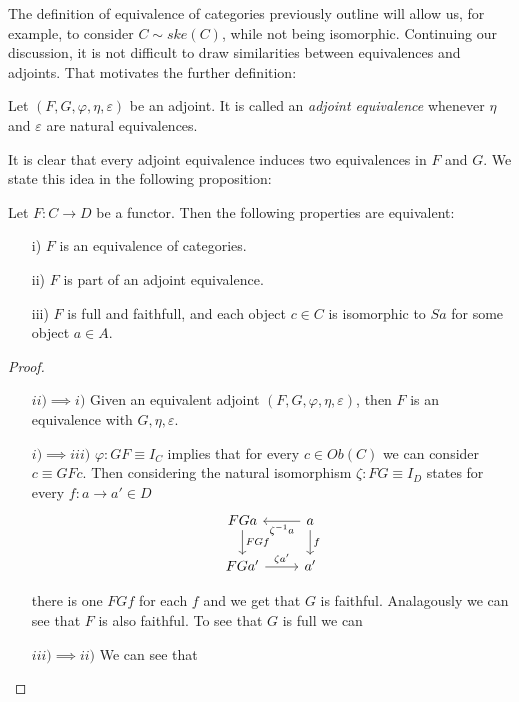   The definition of equivalence of categories previously outline will allow us, for example, to consider $C\sim ske(C)$, while not being isomorphic. Continuing our discussion, it is not difficult to draw similarities between equivalences and adjoints. That motivates the further definition:
  \begin{definition}
    Let $(F,G,\varphi,\eta,\varepsilon)$ be an adjoint. It is called an \emph{adjoint equivalence} whenever $\eta$ and $\varepsilon$ are natural equivalences.
  \end{definition}
  It is clear that every adjoint equivalence induces two equivalences in $F$ and $G$. We state this idea in the following proposition:
  \begin{proposition}\cite[Theorem 1, 4.4]{mac2013categories}
    Let $F:C\to D$ be a functor. Then the following properties are equivalent:
    \begin{itemize}
    \item[i)] $F$ is an equivalence of categories.
    \item[ii)] $F$ is part of an adjoint equivalence. 
    \item[iii)] $F$ is full and faithfull, and each object $c\in C$ is isomorphic to $Sa$ for some object $a\in A$. 
    \end{itemize}  
  \end{proposition}
  \begin{proof}\
    \

    
    \begin{itemize}
    \item[$ii)\implies i)$] Given an equivalent adjoint $(F,G,\varphi,\eta,\varepsilon)$, then $F$ is an equivalence with $G,\eta,\varepsilon$. 
    \item[$i)\implies iii)$] $\varphi: GF\equiv I_C$ implies that for every $c\in Ob(C)$ we can consider $c\equiv GFc$. Then considering the natural isomorphism $\zeta: FG\equiv I_D$ states for every $f:a\to a'\in D$
\[
\begin{tikzcd}
  FGa \arrow{d}{FG f}& a\arrow{d}{f}\arrow{l}{\zeta^{-1} a}\\
  FGa' \arrow{r}{\zeta a'}& a'
\end{tikzcd}
\]

 there is one $FG f$ for each $f$ and we get that $G$ is faithful. Analagously we can see that $F$ is also faithful. To see that $G$ is full we can 
    \item[$iii)\implies ii)$] We can see that 
    \end{itemize}
  \end{proof}


